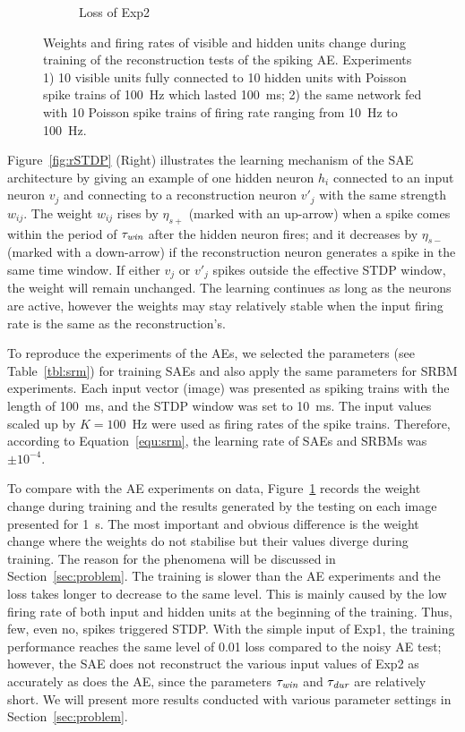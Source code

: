 \begin{figure}
\begin{subfigure}[t]{0.48\textwidth}
		\caption{Loss of Exp2}
	\end{subfigure}
	\caption[SAE training of the reconstruction tests.]{Weights and firing rates of visible and hidden units change during training of the reconstruction tests of the spiking AE. 
		Experiments 1) 10 visible units fully connected to 10 hidden units with Poisson spike trains of 100~Hz which lasted 100~ms; 2) the same network fed with 10 Poisson spike trains of firing rate ranging from 10~Hz to 100~Hz.}
	\label{fig:SAE_orig}
\end{figure}

Figure~\ref{fig:rSTDP} (Right) illustrates the learning mechanism of the SAE architecture by giving an example of one hidden neuron $h_i$ connected to an input neuron $v_j$ and connecting to a reconstruction neuron $v'_j$ with the same strength $w_{ij}$.
The weight $w_{ij}$ rises by $\eta_{s+}$ (marked with an up-arrow) when a spike comes within the period of $\tau_{\textit{\textrm{win}}}$ after the hidden neuron fires;
and it decreases by $\eta_{s-}$ (marked with a down-arrow) if the reconstruction neuron generates a spike in the same time window.
If either $v_j$ or $v'_j$ spikes outside the effective STDP window, the weight will remain unchanged.
The learning continues as long as the neurons are active, however the weights may stay relatively stable when the input firing rate is the same as the reconstruction's.

To reproduce the experiments of the AEs, we selected the parameters (see Table~\ref{tbl:srm}) for training SAEs and also apply the same parameters for SRBM experiments.
Each input vector (image) was presented as spiking trains with the length of 100~ms, and the STDP window was set to 10~ms.
The input values scaled up by $K=100$~Hz were used as firing rates of the spike trains.
Therefore, according to Equation~\ref{equ:srm}, the learning rate of SAEs and SRBMs was $\pm 10^{-4}$.

To compare with the AE experiments on \DIFdelbegin {}\DIFdelend \DIFaddbegin {}\DIFaddend data, Figure~\ref{fig:SAE_orig} records the weight change during training and the results generated by the testing on each image presented for 1~s.
The most important and obvious difference is the weight change where the weights do not stabilise but their values diverge during training.
The reason for the phenomena will be discussed in Section~\ref{sec:problem}.
The training is slower than the AE experiments and the loss takes longer to decrease to the same level.
This is mainly caused by the low firing rate of both input and hidden units at the beginning of the training.
Thus, few, even no, spikes triggered STDP.
With the simple input of Exp1, the training performance reaches the same level of 0.01 loss compared to the noisy AE test;
however, the SAE does not reconstruct the various input values of Exp2 as accurately as does the AE, since the parameters $\tau_{\textit{\textrm{win}}}$ and $\tau_{\textit{\textrm{dur}}}$ are relatively short.
We will present more results conducted with various parameter settings in Section~\ref{sec:problem}.

